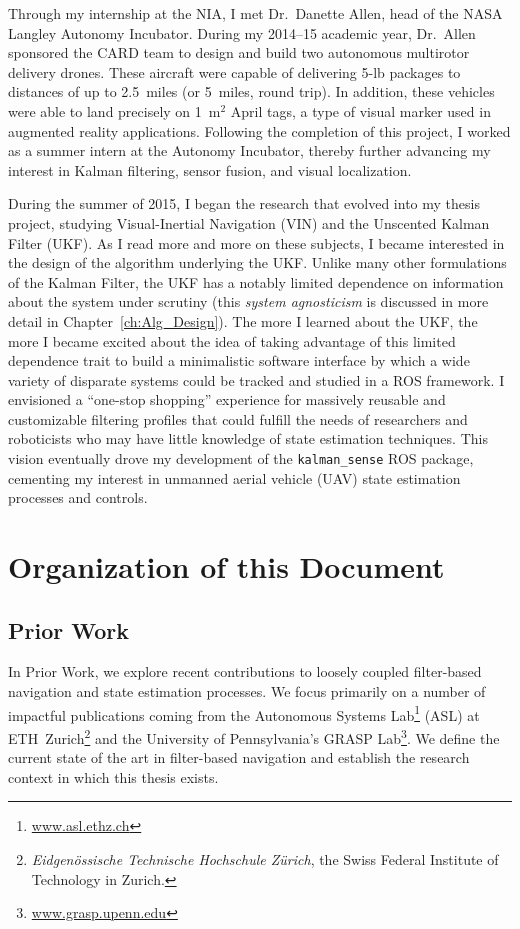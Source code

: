 Through my internship at the NIA, I met Dr.~Danette Allen, head of the NASA Langley Autonomy Incubator. During my 2014--15 academic year, Dr.~Allen sponsored the CARD team to design and build two autonomous multirotor delivery drones. These aircraft were capable of delivering 5\nobreakdash-lb packages to distances of up to 2.5~miles (or 5~miles, round trip). In addition, these vehicles were able to land precisely on 1~m$^2$ April tags, a type of visual marker used in augmented reality applications. Following the completion of this project, I worked as a summer intern at the Autonomy Incubator, thereby further advancing my interest in Kalman filtering, sensor fusion, and visual localization.

During the summer of 2015, I began the research that evolved into my thesis project, studying Visual-Inertial Navigation (VIN) and the Unscented Kalman Filter (UKF). As I read more and more on these subjects, I became interested in the design of the algorithm underlying the UKF. Unlike many other formulations of the Kalman Filter, the UKF has a notably limited dependence on information about the system under scrutiny (this \textit{system agnosticism} is discussed in more detail in Chapter~\ref{ch:Alg_Design}). The more I learned about the UKF, the more I became excited about the idea of taking advantage of this limited dependence trait to build a minimalistic software interface by which a wide variety of disparate systems could be tracked and studied in a ROS framework. I envisioned a ``one-stop shopping'' experience for massively reusable and customizable filtering profiles that could fulfill the needs of researchers and roboticists who may have little knowledge of state estimation techniques. This vision eventually drove my development of the \texttt{kalman\_sense} ROS package, cementing my interest in unmanned aerial vehicle (UAV) state estimation processes and controls.


\section{Organization of this Document}

\subsection*{Prior Work}

In Prior Work, we explore recent contributions to loosely coupled filter-based navigation and state estimation processes. We focus primarily on a number of impactful publications coming from the Autonomous Systems Lab\footnote{\url{www.asl.ethz.ch}} (ASL) at ETH~Zurich\footnote{\textit{Eidgen{\"o}ssische Technische Hochschule Z{\"u}rich}, the Swiss Federal Institute of Technology in Zurich.} and the University of Pennsylvania's GRASP Lab\footnote{\url{www.grasp.upenn.edu}}. We define the current state of the art in filter-based navigation and establish the research context in which this thesis exists.

